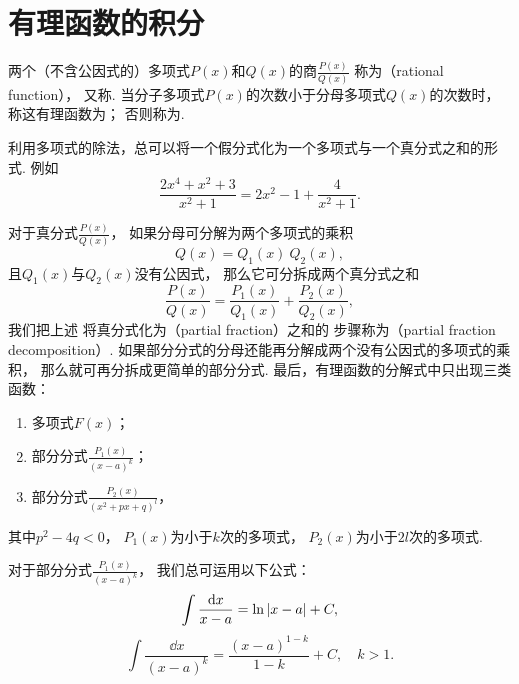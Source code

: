 \section{有理函数的积分}
两个（不含公因式的）多项式\(P(x)\)和\(Q(x)\)的商\(\frac{P(x)}{Q(x)}\)
称为（rational function），
又称.
当分子多项式\(P(x)\)的次数小于分母多项式\(Q(x)\)的次数时，
称这有理函数为；
否则称为.

利用多项式的除法，总可以将一个假分式化为一个多项式与一个真分式之和的形式.
例如\begin{equation*}
	\frac{2x^4+x^2+3}{x^2+1}
	= 2x^2-1+\frac{4}{x^2+1}.
\end{equation*}

对于真分式\(\frac{P(x)}{Q(x)}\)，
如果分母可分解为两个多项式的乘积\begin{equation*}
	Q(x) = Q_1(x)~Q_2(x),
\end{equation*}
且\(Q_1(x)\)与\(Q_2(x)\)没有公因式，
那么它可分拆成两个真分式之和\begin{equation*}
	\frac{P(x)}{Q(x)} = \frac{P_1(x)}{Q_1(x)} + \frac{P_2(x)}{Q_2(x)},
\end{equation*}
我们把上述
将真分式化为（partial fraction）之和的
步骤称为（partial fraction decomposition）.
如果部分分式的分母还能再分解成两个没有公因式的多项式的乘积，
那么就可再分拆成更简单的部分分式.
最后，有理函数的分解式中只出现三类函数：
\begin{enumerate}
	\item 多项式\(F(x)\)；
	\item 部分分式\(\frac{P_1(x)}{(x-a)^k}\)；
	\item 部分分式\(\frac{P_2(x)}{(x^2+px+q)^l}\)，
\end{enumerate}
其中\(p^2-4q<0\)，
\(P_1(x)\)为小于\(k\)次的多项式，
\(P_2(x)\)为小于\(2l\)次的多项式.

对于部分分式\(\frac{P_1(x)}{(x-a)^k}\)，
我们总可运用以下公式：\begin{equation*}
	\int \frac{\dd{x}}{x-a} = \ln\abs{x-a} + C,
\end{equation*}\begin{equation*}
	\int \frac{\dd{x}}{(x-a)^k} = \frac{(x-a)^{1-k}}{1-k} + C,
	\quad k>1.
\end{equation*}

